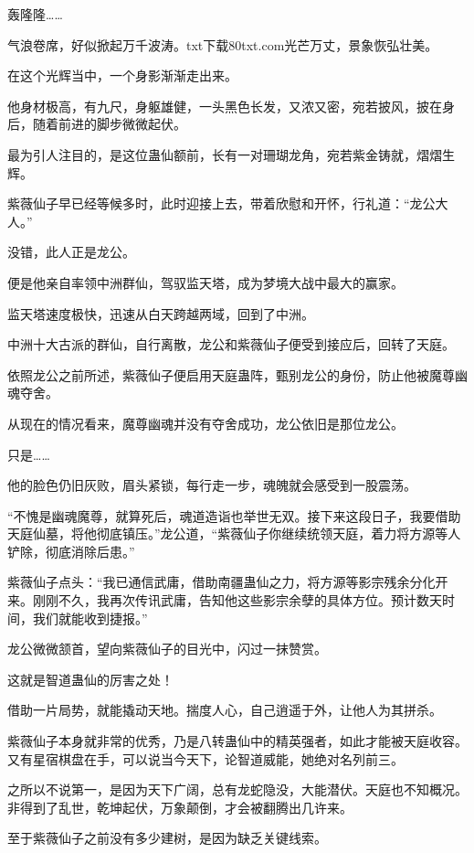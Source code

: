 
\begin{this_body}

轰隆隆……

气浪卷席，好似掀起万千波涛。txt下载80txt.com光芒万丈，景象恢弘壮美。

在这个光辉当中，一个身影渐渐走出来。

他身材极高，有九尺，身躯雄健，一头黑色长发，又浓又密，宛若披风，披在身后，随着前进的脚步微微起伏。

最为引人注目的，是这位蛊仙额前，长有一对珊瑚龙角，宛若紫金铸就，熠熠生辉。

紫薇仙子早已经等候多时，此时迎接上去，带着欣慰和开怀，行礼道：“龙公大人。”

没错，此人正是龙公。

便是他亲自率领中洲群仙，驾驭监天塔，成为梦境大战中最大的赢家。

监天塔速度极快，迅速从白天跨越两域，回到了中洲。

中洲十大古派的群仙，自行离散，龙公和紫薇仙子便受到接应后，回转了天庭。

依照龙公之前所述，紫薇仙子便启用天庭蛊阵，甄别龙公的身份，防止他被魔尊幽魂夺舍。

从现在的情况看来，魔尊幽魂并没有夺舍成功，龙公依旧是那位龙公。

只是……

他的脸色仍旧灰败，眉头紧锁，每行走一步，魂魄就会感受到一股震荡。

“不愧是幽魂魔尊，就算死后，魂道造诣也举世无双。接下来这段日子，我要借助天庭仙墓，将他彻底镇压。”龙公道，“紫薇仙子你继续统领天庭，着力将方源等人铲除，彻底消除后患。”

紫薇仙子点头：“我已通信武庸，借助南疆蛊仙之力，将方源等影宗残余分化开来。刚刚不久，我再次传讯武庸，告知他这些影宗余孽的具体方位。预计数天时间，我们就能收到捷报。”

龙公微微颔首，望向紫薇仙子的目光中，闪过一抹赞赏。

这就是智道蛊仙的厉害之处！

借助一片局势，就能撬动天地。揣度人心，自己逍遥于外，让他人为其拼杀。

紫薇仙子本身就非常的优秀，乃是八转蛊仙中的精英强者，如此才能被天庭收容。又有星宿棋盘在手，可以说当今天下，论智道威能，她绝对名列前三。

之所以不说第一，是因为天下广阔，总有龙蛇隐没，大能潜伏。天庭也不知概况。非得到了乱世，乾坤起伏，万象颠倒，才会被翻腾出几许来。

至于紫薇仙子之前没有多少建树，是因为缺乏关键线索。


\end{this_body}
